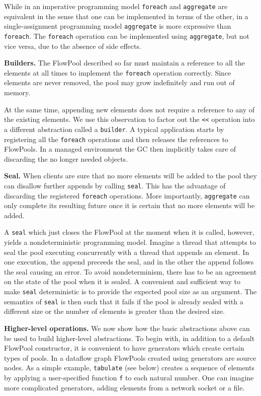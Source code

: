 \documentclass[runningheads,a4paper]{llncs}
\begin{document}
While in an imperative programming model \verb=foreach= and \verb=aggregate= are
equivalent in the sense that one can be implemented in terms of the
other, in a single-assignment programming model \verb=aggregate= is more
expressive than \verb=foreach=.
The \verb=foreach= operation can be implemented using \verb=aggregate=, but not vice versa,
due to the absence of side effects.

\textbf{Builders.}
The FlowPool described so far must maintain a reference 
to all the elements at all times to implement the \verb=foreach=
operation correctly.
Since elements are never removed, the pool may grow indefinitely
and run out of memory.

At the same time, appending new elements does not require a reference
to any of the existing elements.
We use this observation to factor out the \verb=<<= operation into
a different abstraction called a \verb=builder=.
A typical application starts by registering all the \verb=foreach=
operations and then releases the references to FlowPools.
In a managed environment the GC then implicitly takes care of
discarding the no longer needed objects.


\textbf{Seal.}
When clients are sure that no more elements will be added to the pool
they can disallow further appends by calling \verb=seal=.
This has the advantage of discarding the registered \verb=foreach=
operations.
More importantly, \verb=aggregate= can only complete its resulting future
once it is certain that no more elements will be added.

A \verb=seal= which just closes the FlowPool at the moment when it
is called, however, yields a nondeterministic programming model.
Imagine a thread that attempts to seal the pool executing concurrently
with a thread that appends an element.
In one execution, the append preceeds the seal, and in the other
the append follows the seal causing an error.
To avoid nondeterminism, there has to be an agreement on the
state of the pool when it is sealed.
A convenient and sufficient way to make \verb=seal= deterministic
is to provide the expected pool size as an argument.
The semantics of \verb=seal= is then such that it fails if the pool
is already sealed with a different size or the number of elements
is greater than the desired size.

\textbf{Higher-level operations.}
We now show how the basic abstractions above can be used
to build higher-level abstractions.
To begin with, in addition to a default FlowPool constructor, it is
convenient to have generators which create certain types of pools.
In a dataflow graph FlowPools created using generators
are source nodes.
As a simple example, \verb=tabulate= (see below) creates a sequence of elements
by applying a user-specified function \verb=f= to each natural number.
One can imagine more complicated generators, adding elements from a
network socket or a file.
\end{document}
